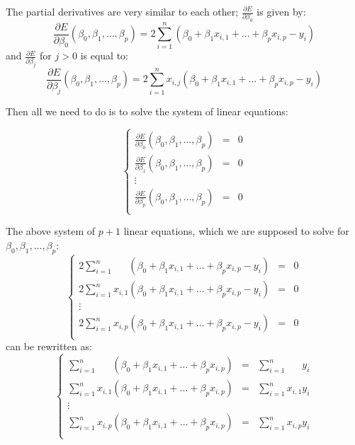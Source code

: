 \documentclass[10pt,b5paper,krantz1]{krantz}
\begin{document}
The partial derivatives are very similar to each other;
\(\frac{\partial E}{\partial \beta_0}\) is given by:
\[
\frac{\partial E}{\partial \beta_0}(\beta_0,\beta_1,\dots,\beta_p)=
2 \sum_{i=1}^n \left( \beta_0 + \beta_1 x_{i,1}+\dots+\beta_p x_{i,p} - y_{i} \right)
\]
and \(\frac{\partial E}{\partial \beta_j}\) for \(j>0\) is equal to:
\[
\frac{\partial E}{\partial \beta_j}(\beta_0,\beta_1,\dots,\beta_p)=
2 \sum_{i=1}^n x_{i,j} \left( \beta_0 + \beta_1 x_{i,1}+\dots+\beta_p x_{i,p} - y_{i} \right)
\]

Then all we need to do is to solve the system of linear equations:

\[
\left\{
\begin{array}{rcl}
\frac{\partial E}{\partial \beta_0}(\beta_0,\beta_1,\dots,\beta_p)&=&0 \\
\frac{\partial E}{\partial \beta_1}(\beta_0,\beta_1,\dots,\beta_p)&=&0 \\
\vdots\\
\frac{\partial E}{\partial \beta_p}(\beta_0,\beta_1,\dots,\beta_p)&=&0 \\
\end{array}
\right.
\]

The above system of \(p+1\) linear equations, which we are supposed to solve
for \(\beta_0,\beta_1,\dots,\beta_p\):
\[
\left\{
\begin{array}{rcl}
2 \sum_{i=1}^n \phantom{x_{i,0}}\left( \beta_0 + \beta_1 x_{i,1}+\dots+\beta_p x_{i,p} - y_{i} \right)&=&0 \\
2 \sum_{i=1}^n x_{i,1} \left( \beta_0 + \beta_1 x_{i,1}+\dots+\beta_p x_{i,p} - y_{i} \right)&=&0 \\
\vdots\\
2 \sum_{i=1}^n x_{i,p} \left( \beta_0 + \beta_1 x_{i,1}+\dots+\beta_p x_{i,p} - y_{i} \right)&=&0 \\
\end{array}
\right.
\]
can be rewritten as:
\[
\left\{
\begin{array}{rcl}
\sum_{i=1}^n \phantom{x_{i,0}}\left( \beta_0 + \beta_1 x_{i,1}+\dots+\beta_p x_{i,p}\right)&=& \sum_{i=1}^n \phantom{x_{i,0}} y_i \\
\sum_{i=1}^n x_{i,1} \left( \beta_0 + \beta_1 x_{i,1}+\dots+\beta_p x_{i,p}\right)&=&\sum_{i=1}^n x_{i,1} y_i \\
\vdots\\
\sum_{i=1}^n x_{i,p} \left( \beta_0 + \beta_1 x_{i,1}+\dots+\beta_p x_{i,p}\right)&=&\sum_{i=1}^n x_{i,p} y_i \\
\end{array}
\right.
\]
\end{document}
